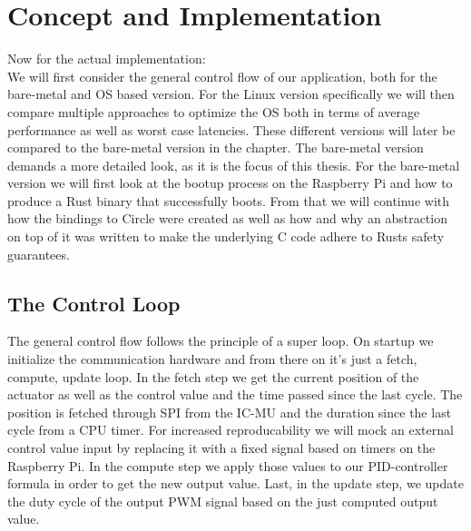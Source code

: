 
\chapter{Concept and Implementation}
\label{chap:concept_and_implementation}

Now for the actual implementation:\\
We will first consider the general control flow of our application, both for the bare-metal and OS based version.
For the Linux version specifically we will then compare multiple approaches to optimize the OS both in terms of average performance as well as worst case latencies.
These different versions will later be compared to the bare-metal version in the  chapter.
The bare-metal version demands a more detailed look, as it is the focus of this thesis.
For the bare-metal version we will first look at the bootup process on the Raspberry Pi and how to produce a Rust binary that successfully boots.
From that we will continue with how the bindings to Circle were created as well as how and why an abstraction on top of it was written to make the underlying C code adhere to Rusts safety guarantees.

\section{The Control Loop}
\label{sec:concept_and_implementation:control_flow}

The general control flow follows the principle of a super loop.
On startup we initialize the communication hardware and from there on it's just a fetch, compute, update loop.
In the fetch step we get the current position of the actuator as well as the control value and the time passed since the last cycle.
The position is fetched through SPI from the IC-MU and the duration since the last cycle from a CPU timer.
For increased reproducability we will mock an external control value input by replacing it with a fixed signal based on timers on the Raspberry Pi.
In the compute step we apply those values to our PID-controller formula in order to get the new output value.
Last, in the update step, we update the duty cycle of the output PWM signal based on the just computed output value.

